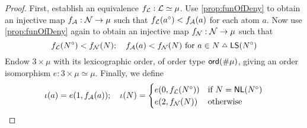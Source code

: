 \begin{proof}
  First, establish an equivalence \( f_{\mathcal L} : {\mathcal L} \simeq \mu \).
  Use \cref{prop:funOfDeny} to obtain an injective map \( f_{\mathcal A} : {\mathcal N} \to \mu \) such that \( f_{\mathcal L}(a^\circ) < f_{\mathcal A}(a) \) for each atom \( a \).
  Now use \cref{prop:funOfDeny} again to obtain an injective map \( f_{\mathcal N} : {\mathcal N} \to \mu \) such that
  \[ f_\Litter(N^\circ) < f_\NearLitter(N);\quad f_\Atom(a) < f_\NearLitter(N) \text{ for } a \in N \symmdiff \LS(N^\circ) \]
  Endow \( 3 \times \mu \) with its lexicographic order, of order type \( \operatorname{\mathsf{ord}}(\#\mu) \), giving an order isomorphism \( e : 3 \times \mu \simeq \mu \).
  Finally, we define
  \[ \iota(a) = e(1, f_{\mathcal A}(a));\quad \iota(N) = \begin{cases}
    e(0, f_{\mathcal L}(N^\circ)) & \text{if } N = \operatorname{\mathsf{NL}}(N^\circ) \\
    e(2, f_{\mathcal N}(N)) & \text{otherwise}
  \end{cases} \]
\end{proof}

